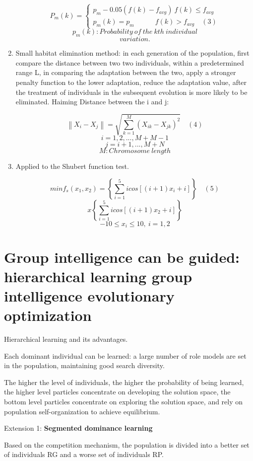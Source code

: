 \documentclass[twocolumn]{article}
\begin{document}
\begin{enumerate}
	\[P_m(k)=\begin{cases}
		p_m - 0.05(f(k)-f_{avg})\ f(k)\leq f_{avg}\ \\
		p_m(k)=p_m\qquad \quad f(k)>f_{avg}\quad (3)
	\end{cases}\]
	\[p_m(k):Probability\ of\ the\ kth\ individual\]
	\[variation.\]
	
	
	\item
	Small habitat elimination method: in each generation of the
	population, first compare the distance between two two individuals,
	within a predetermined range L, in comparing the adaptation between
	the two, apply a stronger penalty function to the lower adaptation,
	reduce the adaptation value, after the treatment of individuals in the
	subsequent evolution is more likely to be eliminated. Haiming Distance
	between the i and j:
	
	\[\left\|X_i-X_j\right\|=\sqrt{\sum_{k=1}^{M}(X_{ik}-X_{jk})^2}\quad (4)\]
	\[i=1,2,...,M+M-1\]
	\[j=i+1,...,M+N\]
	\[M:Chromosome\ length\]
	
	
	\item
	Applied to the Shubert function test.
	
	\[minf_s(x_1,x_2)=\left\{
	\sum_{i=1}^5icos\left[(i+1)x_i+i\right]
	\right\}\quad(5)\]
	\[x\left\{\sum_{i=1}^5icos[(i+1)x_2+i]
	\right\}\]
	\[-10\leq x_i \leq 10,\ i=1,2\]
	
	
\end{enumerate}


\section{Group intelligence can be guided: hierarchical learning group intelligence evolutionary optimization}

Hierarchical learning and its advantages.

Each dominant individual can be learned: a large number of role models
are set in the population, maintaining good search diversity.

The higher the level of individuals, the higher the probability of
being learned, the higher level particles concentrate on developing
the solution space, the bottom level particles concentrate on
exploring the solution space, and rely on population self-organization
to achieve equilibrium.

Extension 1: \textbf{Segmented dominance learning}


Based on the competition mechanism, the population is divided into a better set of individuals RG and a worse set of individuals RP.
\end{document}
